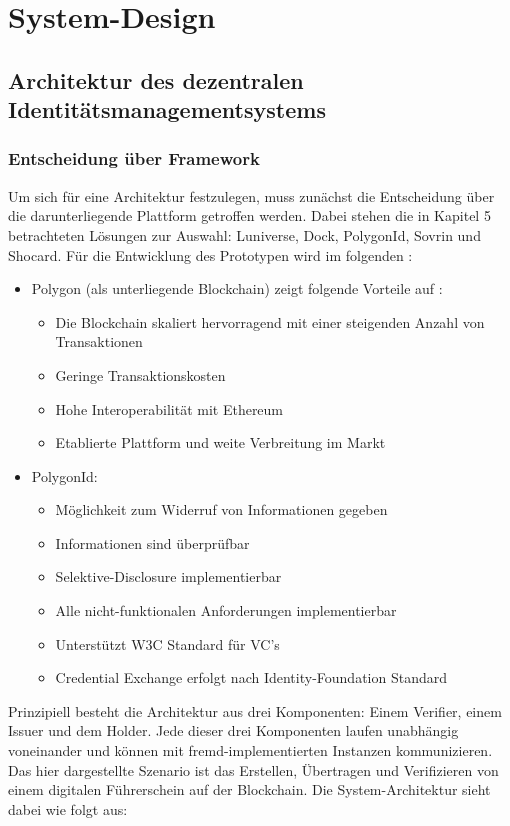 \chapter{System-Design}
\label{cha:systemdesign}

\section{Architektur des dezentralen Identitätsmanagementsystems}

\subsection{Entscheidung über Framework}
Um sich für eine Architektur festzulegen, muss zunächst die Entscheidung über die darunterliegende Plattform getroffen werden. Dabei stehen die in Kapitel 5 betrachteten Lösungen zur Auswahl: Luniverse, Dock, PolygonId, Sovrin und Shocard. Für die Entwicklung des Prototypen wird im folgenden :
\begin{itemize}
	
	\item Polygon (als unterliegende Blockchain) zeigt folgende Vorteile auf \cite{ID54}:
	\begin{itemize}
		\item Die Blockchain skaliert hervorragend mit einer steigenden Anzahl von Transaktionen
		\item Geringe Transaktionskosten
		\item Hohe Interoperabilität mit Ethereum
		\item Etablierte Plattform und weite Verbreitung im Markt
	\end{itemize}
	
	\item PolygonId:
	\begin{itemize}
		\item Möglichkeit zum Widerruf von Informationen gegeben
		\item Informationen sind überprüfbar
		\item Selektive-Disclosure implementierbar
		\item Alle nicht-funktionalen Anforderungen implementierbar
		\item Unterstützt W3C Standard für VC's
		\item Credential Exchange erfolgt nach Identity-Foundation Standard
	\end{itemize}
\end{itemize}
Prinzipiell besteht die Architektur aus drei Komponenten: Einem Verifier, einem Issuer und dem Holder. Jede dieser drei Komponenten laufen unabhängig voneinander und können mit fremd-implementierten Instanzen kommunizieren. Das hier dargestellte Szenario ist das Erstellen, Übertragen und Verifizieren von einem digitalen Führerschein auf der Blockchain. Die System-Architektur sieht dabei wie folgt aus:

